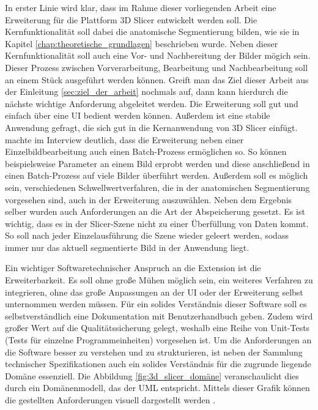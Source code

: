 In erster Linie wird klar, dass im Rahme dieser vorliegenden Arbeit eine Erweiterung
für die Plattform 3D Slicer entwickelt werden soll. Die Kernfunktionalität soll
dabei die anatomische Segmentierung bilden, wie sie in Kapitel \ref{chap:theoretische_grundlagen}
beschrieben wurde. Neben dieser Kernfunktionalität soll auch eine Vor- und Nachbereitung
der Bilder mögich sein. Dieser Prozess zwischen Vorverarbeitung, Bearbeitung und
Nachbearbeitung soll an einem Stück ausgeführt werden können. Greift man das
Ziel dieser Arbeit aus der Einleitung \ref{sec:ziel_der_arbeit} nochmals auf, dann
kann hierdurch die nächste wichtige Anforderung abgeleitet werden. Die
Erweiterung soll gut und einfach über eine \ac{UI} bedient werden können.
Außerdem ist eine stabile Anwendung gefragt, die sich gut in die Kernanwendung von
3D Slicer einfügt. \citet[]{walter2025} machte im Interview deutlich, dass die
Erweiterung neben einer Einzelbildbearbeitung auch einen Batch-Prozess
ermöglichen so. So können beispielsweise Parameter an einem Bild erprobt werden und
diese anschließend in einen Batch-Prozess auf viele Bilder überführt werden.
Außerdem soll es möglich sein, verschiedenen Schwellwertverfahren, die in der
anatomischen Segmentierung vorgesehen sind, auch in der Erweiterung auszuwählen.
Neben dem Ergebnis selber wurden auch Anforderungen an die Art der Abspeicherung
gesetzt. Es ist wichtig, dass es in der Slicer-Szene nicht zu einer Überfüllung
von Daten kommt. So soll nach jeder Einzelausführung die Szene wieder geleert werden,
sodass immer nur das aktuell segmentierte Bild in der Anwendung liegt.

Ein wichtiger Softwaretechnischer Anspruch an die Extension ist die
Erweiterbarkeit. Es soll ohne große Mühen möglich sein, ein weiteres Verfahren
zu integrieren, ohne das große Anpassungen an der UI oder der Erweiterung selbst
unternommen werden müssen. Für ein solides Verständnis dieser Software soll es
selbstverständlich eine Dokumentation mit Benutzerhandbuch geben. Zudem wird großer
Wert auf die Qualitätssicherung gelegt, weshalb eine Reihe von Unit-Tests (Tests
für einzelne Programmeinheiten) vorgesehen ist. Um die Anforderungen an die Software
besser zu verstehen und zu strukturieren, ist neben der Sammlung technischer
Spezifikationen auch ein solides Verständnis für die zugrunde liegende Domäne
essenziell. Die Abbildung \ref{fig:3d_slicer_domäne} veranschaulicht dies durch ein
Domänenmodell, das der \ac{UML} entspricht. Mittels dieser Grafik können die
gestellten Anforderungen visuell dargestellt werden \citep[vgl.][]{walter2025}.

